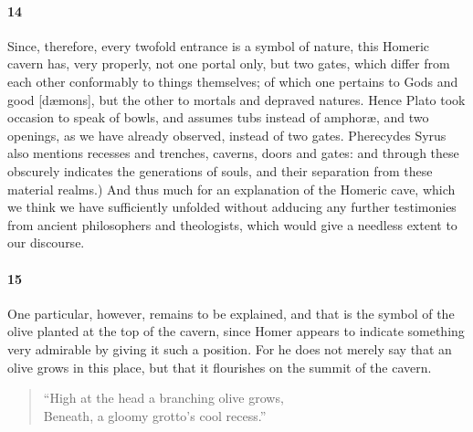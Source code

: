 \documentclass[a4paper,12pt]{article}
\begin{document}
\paragraph{14} Since, therefore, every twofold entrance is a symbol of nature,
this Homeric cavern has, very properly, not one portal only, but two gates,
which differ from each other conformably to things themselves; of which one
pertains to Gods and good [d{\ae}mons], but the other to mortals and depraved
natures. Hence Plato took occasion to speak of bowls, and assumes tubs instead
of amphor{\ae}, and two openings, as we have already observed, instead of two
gates. Pherecydes Syrus also mentions recesses and trenches, caverns, doors and
gates: and through these obscurely indicates the generations of souls, and
their separation from these material realms.) And thus much for an explanation
of the Homeric cave, which we think we have sufficiently unfolded without
adducing any further testimonies from ancient philosophers and theologists,
which would give a needless extent to our discourse.


\paragraph{15} One particular, however, remains to be explained, and that is
the symbol of the olive planted at the top of the cavern, since Homer appears
to indicate something very admirable by giving it such a position. For he does
not merely say that an olive grows in this place, but that it flourishes on the
summit of the cavern.

\begin{verse}
``High at the head a branching olive grows,\\
Beneath, a gloomy grotto's cool recess.''
\end{verse}
\end{document}
